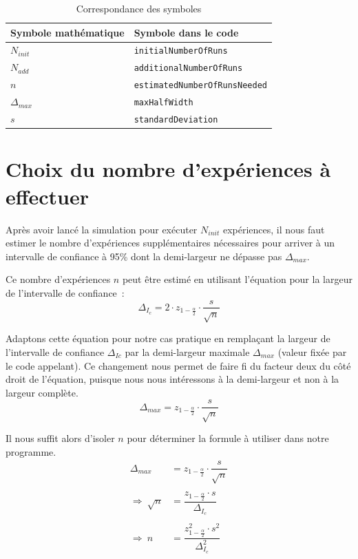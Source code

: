 \documentclass[paper=a4, fontsize=11pt]{scrartcl}
\begin{document}
\begin{table}
  \centering
  \begin{tabular}{|l|l|}
    \hline
    Symbole mathématique & Symbole dans le code \\
    \hline
    $N_{init}$ & \texttt{initialNumberOfRuns} \\
    $N_{add}$ & \texttt{additionalNumberOfRuns} \\
    $n$ & \texttt{estimatedNumberOfRunsNeeded} \\
    $\Delta_{max}$ & \texttt{maxHalfWidth} \\
    $s$ & \texttt{standardDeviation} \\
    \hline
  \end{tabular}
  \caption{Correspondance des symboles}
  \label{table:correspondance}
\end{table}

\section{Choix du nombre d'expériences à effectuer}

Après avoir lancé la simulation pour exécuter $N_{init}$ expériences, il nous faut estimer le nombre d'expériences supplémentaires nécessaires pour arriver à un intervalle de confiance à 95\% dont la demi-largeur ne dépasse pas $\Delta_{max}$.

Ce nombre d'expériences $n$ peut être estimé en utilisant l'équation pour la largeur de l'intervalle de confiance~:
\begin{equation*}
  \Delta_{I_c} = 2\cdot z_{1-\frac{\alpha}{2}}\cdot \dfrac{s}{\sqrt{n}}
\end{equation*}

Adaptons cette équation pour notre cas pratique en remplaçant la largeur de l'intervalle de confiance $\Delta_{Ic}$ par la demi-largeur maximale $\Delta_{max}$ (valeur fixée par le code appelant). Ce changement nous permet de faire fi du facteur deux du côté droit de l'équation, puisque nous nous intéressons à la demi-largeur et non à la largeur complète.
\begin{equation*}
  \Delta_{max} = z_{1-\frac{\alpha}{2}}\cdot \dfrac{s}{\sqrt{n}}
\end{equation*}

Il nous suffit alors d'isoler $n$ pour déterminer la formule à utiliser dans notre programme.
\begin{align*}
  \Delta_{max} &= z_{1-\frac{\alpha}{2}}\cdot \dfrac{s}{\sqrt{n}} \\ \\
  \Rightarrow \ \sqrt{n} &= \dfrac{z_{1-\frac{\alpha}{2}}\cdot s}{\Delta_{I_c}} \\ \\
  \Rightarrow \ n &= \dfrac{z_{1-\frac{\alpha}{2}}^2\cdot s^2}{\Delta_{I_c}^2}
\end{align*}
\end{document}
